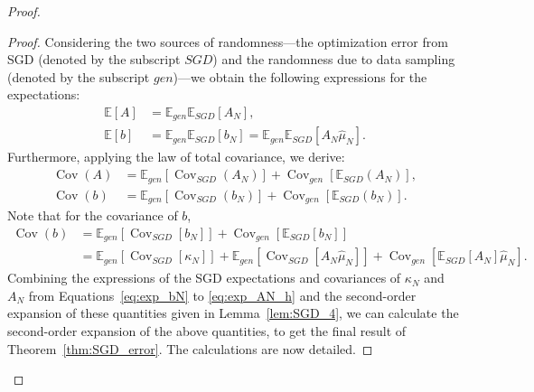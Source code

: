 \documentclass[11pt]{article}
\newcommand{\id}{\operatorname{Id}}
\newcommand{\EE}{\mathbb{E}}
\newcommand{\cov}{\operatorname{Cov}}
\begin{document}
\begin{proof}
\begin{proof}
Considering the two sources of randomness—the optimization error from SGD (denoted by the subscript \(SGD\)) and the randomness due to data sampling (denoted by the subscript \(gen\))—we obtain the following expressions for the expectations:
\begin{align*} 
\mathbb{E}[A] &= \mathbb{E}_{gen} \mathbb{E}_{SGD} [A_N], \\
\mathbb{E}[b] &= \mathbb{E}_{gen} \mathbb{E}_{SGD} [b_N] = \mathbb{E}_{gen} \mathbb{E}_{SGD} [A_N \hat \mu_N] .
\end{align*}
Furthermore, applying the law of total covariance, we derive:
\begin{align*}
\operatorname{Cov}(A) &= \mathbb{E}_{gen} [\operatorname{Cov}_{SGD} (A_N)] + \operatorname{Cov}_{gen} [\mathbb{E}_{SGD} (A_N)], \\
\operatorname{Cov}(b) &= \mathbb{E}_{gen} [\operatorname{Cov}_{SGD} (b_N)] + \operatorname{Cov}_{gen} [\mathbb{E}_{SGD} (b_N)] .
\end{align*}
Note that for the covariance of $b$,
\begin{align*}
    \cov(b) &= \EE_{gen}[\cov_{SGD}[b_N]] + \cov_{gen}[\EE_{SGD}[b_N]] \\
    &= \EE_{gen}[\cov_{SGD}[\kappa_N]] + \EE_{gen}[\cov_{SGD}[A_N \hat \mu_N]] + \cov_{gen}[\EE_{SGD}[A_N] \hat \mu_N].
\end{align*}
Combining the expressions of the SGD expectations and covariances of $\kappa_N$ and $A_N$ from Equations~\eqref{eq:exp_bN} to \eqref{eq:exp_AN_h} and the second-order expansion of these quantities given in Lemma~\ref{lem:SGD_4}, we can calculate the second-order expansion of the above quantities, to get the final result of Theorem~\ref{thm:SGD_error}. 
The calculations are now detailed.


\end{proof}
\end{proof}
\end{document}
